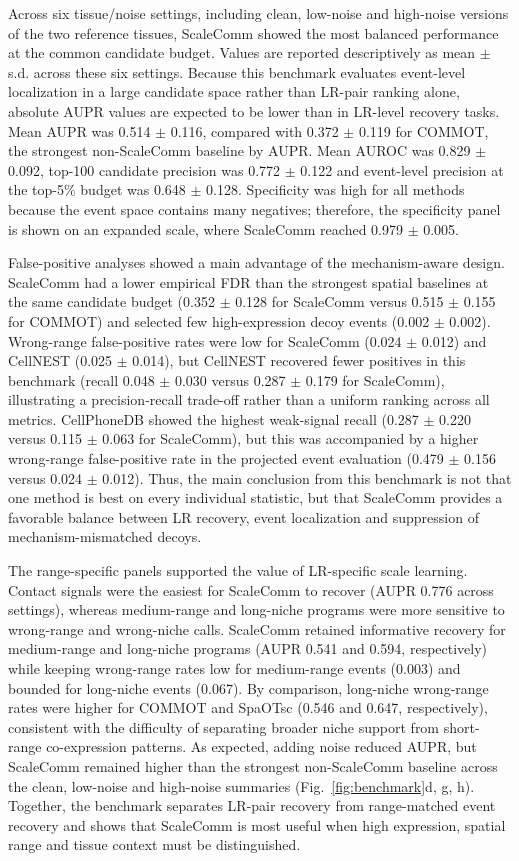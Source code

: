 \documentclass[referee,lineno,pdflatex,sn-vancouver-num]{sn-jnl}
\begin{document}
Across six tissue/noise settings, including clean, low-noise and high-noise versions of the two reference tissues, ScaleComm showed the most balanced performance at the common candidate budget. Values are reported descriptively as mean $\pm$ s.d. across these six settings. Because this benchmark evaluates event-level localization in a large candidate space rather than LR-pair ranking alone, absolute AUPR values are expected to be lower than in LR-level recovery tasks. Mean AUPR was 0.514 $\pm$ 0.116, compared with 0.372 $\pm$ 0.119 for COMMOT, the strongest non-ScaleComm baseline by AUPR. Mean AUROC was 0.829 $\pm$ 0.092, top-100 candidate precision was 0.772 $\pm$ 0.122 and event-level precision at the top-5\% budget was 0.648 $\pm$ 0.128. Specificity was high for all methods because the event space contains many negatives; therefore, the specificity panel is shown on an expanded scale, where ScaleComm reached 0.979 $\pm$ 0.005.

False-positive analyses showed a main advantage of the mechanism-aware design. ScaleComm had a lower empirical FDR than the strongest spatial baselines at the same candidate budget (0.352 $\pm$ 0.128 for ScaleComm versus 0.515 $\pm$ 0.155 for COMMOT) and selected few high-expression decoy events (0.002 $\pm$ 0.002). Wrong-range false-positive rates were low for ScaleComm (0.024 $\pm$ 0.012) and CellNEST (0.025 $\pm$ 0.014), but CellNEST recovered fewer positives in this benchmark (recall 0.048 $\pm$ 0.030 versus 0.287 $\pm$ 0.179 for ScaleComm), illustrating a precision-recall trade-off rather than a uniform ranking across all metrics. CellPhoneDB showed the highest weak-signal recall (0.287 $\pm$ 0.220 versus 0.115 $\pm$ 0.063 for ScaleComm), but this was accompanied by a higher wrong-range false-positive rate in the projected event evaluation (0.479 $\pm$ 0.156 versus 0.024 $\pm$ 0.012). Thus, the main conclusion from this benchmark is not that one method is best on every individual statistic, but that ScaleComm provides a favorable balance between LR recovery, event localization and suppression of mechanism-mismatched decoys.

The range-specific panels supported the value of LR-specific scale learning. Contact signals were the easiest for ScaleComm to recover (AUPR 0.776 across settings), whereas medium-range and long-niche programs were more sensitive to wrong-range and wrong-niche calls. ScaleComm retained informative recovery for medium-range and long-niche programs (AUPR 0.541 and 0.594, respectively) while keeping wrong-range rates low for medium-range events (0.003) and bounded for long-niche events (0.067). By comparison, long-niche wrong-range rates were higher for COMMOT and SpaOTsc (0.546 and 0.647, respectively), consistent with the difficulty of separating broader niche support from short-range co-expression patterns. As expected, adding noise reduced AUPR, but ScaleComm remained higher than the strongest non-ScaleComm baseline across the clean, low-noise and high-noise summaries (Fig.~\ref{fig:benchmark}d, g, h). Together, the benchmark separates LR-pair recovery from range-matched event recovery and shows that ScaleComm is most useful when high expression, spatial range and tissue context must be distinguished.
\end{document}
